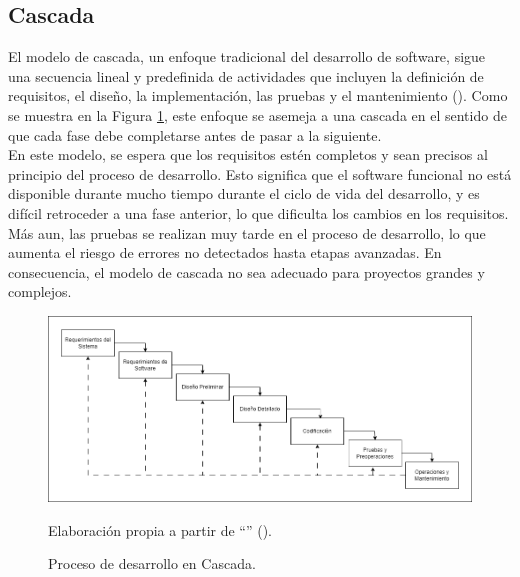 \subsection{Cascada}
El modelo de cascada, un enfoque tradicional del desarrollo de software, sigue una secuencia lineal y predefinida de actividades que incluyen la definición de requisitos, el diseño, la implementación, las pruebas y el mantenimiento (\cite{auer1990solution}). Como se muestra en la Figura \ref{figs:modelo_desarrollo_cascada}, este enfoque se asemeja a una cascada en el sentido de que cada fase debe completarse antes de pasar a la siguiente.\\
En este modelo, se espera que los requisitos estén completos y sean precisos al principio del proceso de desarrollo. Esto significa que el software funcional no está disponible durante mucho tiempo durante el ciclo de vida del desarrollo, y es difícil retroceder a una fase anterior, lo que dificulta los cambios en los requisitos.  Más aun, las pruebas se realizan muy tarde en el proceso de desarrollo, lo que aumenta el riesgo de errores no detectados hasta etapas avanzadas. En consecuencia, el modelo de cascada no sea adecuado para proyectos grandes y complejos.
\begin{figure}[H]
	\centering
	\includegraphics[width=1.0\textwidth]{images/marcoteorico/modelo_cascada.png}
	\caption{Proceso de desarrollo en Cascada.}
    \vspace{-0.2cm}
	\footnotesize{{Elaboración propia a partir de ``\textit{}'' (\citeyear{auer1990solution}).}}
	\label{figs:modelo_desarrollo_cascada} 
\end{figure}
